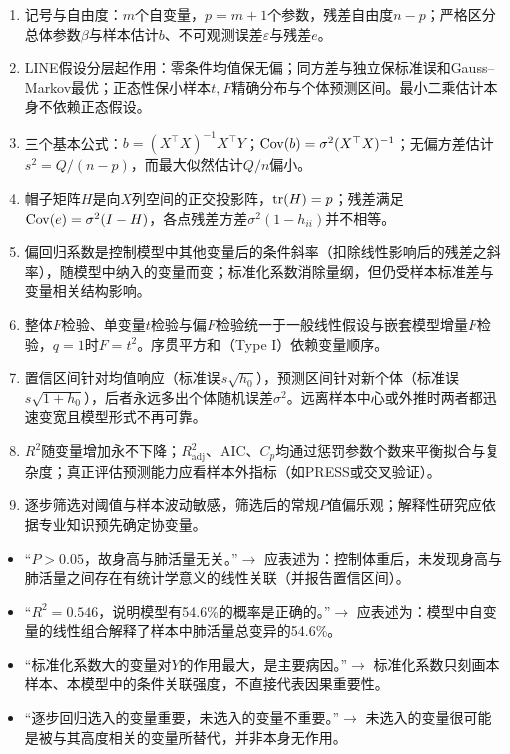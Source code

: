 \begin{fuxi}
\begin{enumerate}
\item 记号与自由度：$m$个自变量，$p=m+1$个参数，残差自由度$n-p$；严格区分总体参数$\beta$与样本估计$b$、不可观测误差$\varepsilon$与残差$e$。
\item LINE假设分层起作用：零条件均值保无偏；同方差与独立保标准误和Gauss--Markov最优；正态性保小样本$t,F$精确分布与个体预测区间。最小二乘估计本身不依赖正态假设。
\item 三个基本公式：$b=(X^\top X)^{-1}X^\top Y$；$\operatorname{Cov}(b)=\sigma^2(X^\top X)^{-1}$；无偏方差估计$s^2=Q/(n-p)$，而最大似然估计$Q/n$偏小。
\item 帽子矩阵$H$是向$X$列空间的正交投影阵，$\operatorname{tr}(H)=p$；残差满足$\operatorname{Cov}(e)=\sigma^2(I-H)$，各点残差方差$\sigma^2(1-h_{ii})$并不相等。
\item 偏回归系数是控制模型中其他变量后的条件斜率（扣除线性影响后的残差之斜率），随模型中纳入的变量而变；标准化系数消除量纲，但仍受样本标准差与变量相关结构影响。
\item 整体$F$检验、单变量$t$检验与偏$F$检验统一于一般线性假设与嵌套模型增量$F$检验，$q=1$时$F=t^2$。序贯平方和（Type I）依赖变量顺序。
\item 置信区间针对均值响应（标准误$s\sqrt{h_0}$），预测区间针对新个体（标准误$s\sqrt{1+h_0}$），后者永远多出个体随机误差$\sigma^2$。远离样本中心或外推时两者都迅速变宽且模型形式不再可靠。
\item $R^2$随变量增加永不下降；$R^2_{\mathrm{adj}}$、AIC、$C_p$均通过惩罚参数个数来平衡拟合与复杂度；真正评估预测能力应看样本外指标（如PRESS或交叉验证）。
\item 逐步筛选对阈值与样本波动敏感，筛选后的常规$P$值偏乐观；解释性研究应依据专业知识预先确定协变量。
\end{enumerate}
\end{fuxi}

\begin{fuxi}[常见错误表述]
\begin{itemize}
\item “$P>0.05$，故身高与肺活量无关。”$\longrightarrow$ 应表述为：控制体重后，未发现身高与肺活量之间存在有统计学意义的线性关联（并报告置信区间）。
\item “$R^2=0.546$，说明模型有54.6\%的概率是正确的。”$\longrightarrow$ 应表述为：模型中自变量的线性组合解释了样本中肺活量总变异的54.6\%。
\item “标准化系数大的变量对$Y$的作用最大，是主要病因。”$\longrightarrow$ 标准化系数只刻画本样本、本模型中的条件关联强度，不直接代表因果重要性。
\item “逐步回归选入的变量重要，未选入的变量不重要。”$\longrightarrow$ 未选入的变量很可能是被与其高度相关的变量所替代，并非本身无作用。
\end{itemize}
\end{fuxi}
